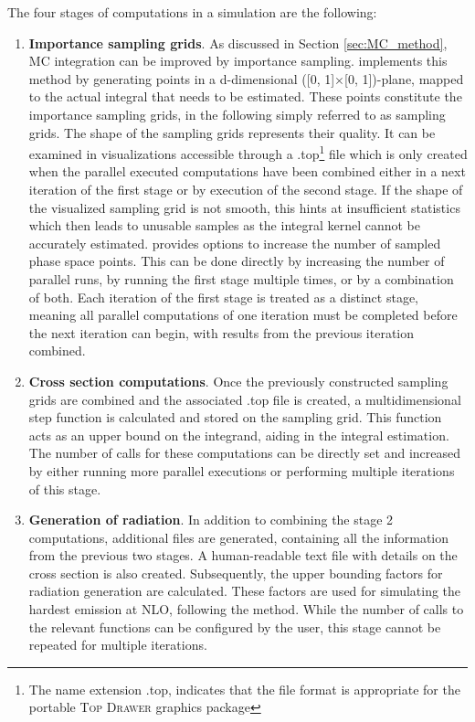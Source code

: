 \indent The four stages of computations in a {\selectfont{Powheg Box Res}} simulation are the following:
\begin{enumerate}
    \item \textbf{Importance sampling grids}. As discussed in Section \ref{sec:MC_method}, MC integration can be improved by importance sampling. {\selectfont{Powheg Box Res}} implements this method by generating points in a d-dimensional ([0, 1]$\times$[0, 1])-plane, mapped to the actual integral that needs to be estimated. These points constitute the importance sampling grids, in the following simply referred to as sampling grids. The shape of the sampling grids represents their quality. It can be examined in visualizations accessible through a .top\footnote{The name extension .top, indicates that the file format is appropriate for the portable \textsc{Top Drawer} graphics package} file which is only created when the parallel executed computations have been combined either in a next iteration of the first stage or by execution of the second stage. If the shape of the visualized sampling grid is not smooth, this hints at insufficient statistics which then leads to unusable samples as the integral kernel cannot be accurately estimated. {\selectfont{Powheg Box Res}} provides options to increase the number of sampled phase space points. This can be done directly by increasing the number of parallel runs, by running the first stage multiple times, or by a combination of both. Each iteration of the first stage is treated as a distinct stage, meaning all parallel computations of one iteration must be completed before the next iteration can begin, with results from the previous iteration combined.
    \item \textbf{Cross section computations}. Once the previously constructed sampling grids are combined and the associated .top file is created, a multidimensional step function is calculated and stored on the sampling grid. This function acts as an upper bound on the integrand, aiding in the integral estimation. The number of calls for these computations can be directly set and increased by either running more parallel executions or performing multiple iterations of this stage.
    \item \textbf{Generation of radiation}. In addition to combining the stage 2 computations, additional files are generated, containing all the information from the previous two stages. A human-readable text file with details on the cross section is also created. Subsequently, the upper bounding factors for radiation generation are calculated. These factors are used for simulating the hardest emission at NLO, following the {\selectfont{Powheg}} method. While the number of calls to the relevant functions can be configured by the user, this stage cannot be repeated for multiple iterations.

\end{enumerate}
